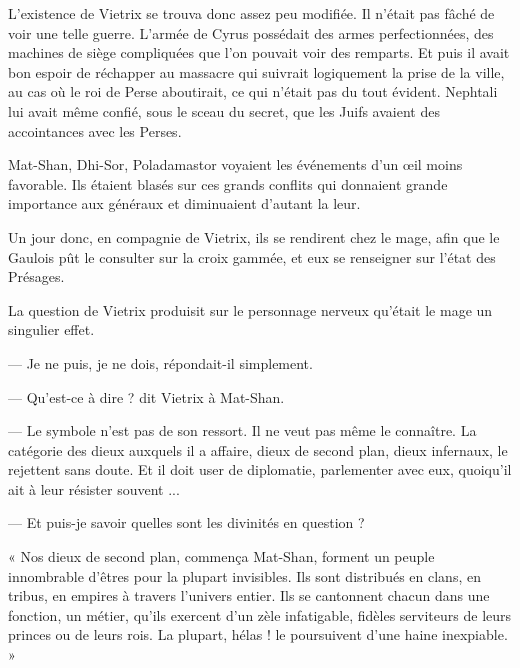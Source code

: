 \documentclass[a4paper, 11pt, oneside, polutonikogreek, french]{article}
\begin{document}
L'existence de Vietrix se trouva donc assez peu modifiée. Il n'était pas fâché de voir une telle guerre. L'armée de Cyrus possédait des armes perfectionnées, des machines de siège compliquées que l'on pouvait voir des remparts. Et puis il avait bon espoir de réchapper au massacre qui suivrait logiquement la prise de la ville, au cas où le roi de Perse aboutirait, ce qui n'était pas du tout évident. Nephtali lui avait même confié, sous le sceau du secret, que les Juifs avaient des accointances avec les Perses.

\bigskip
\centerline{\EightStarTaper}
\centerline{\EightStarTaper\EightStarTaper}
\bigskip

Mat-Shan, Dhi-Sor, Poladamastor voyaient les événements d'un œil moins favorable. Ils étaient blasés sur ces grands conflits qui donnaient grande importance aux généraux et diminuaient d'autant la leur.

Un jour donc, en compagnie de Vietrix, ils se rendirent chez le mage, afin que le Gaulois pût le consulter sur la croix gammée, et eux se renseigner sur l'état des Présages.

La question de Vietrix produisit sur le personnage nerveux qu'était le mage un singulier effet.

--- Je ne puis, je ne dois, répondait-il simplement.

--- Qu'est-ce à dire ? dit Vietrix à Mat-Shan.

--- Le symbole n'est pas de son ressort. Il ne veut pas même le connaître. La catégorie des dieux auxquels il a affaire, dieux de second plan, dieux infernaux, le rejettent sans doute. Et il doit user de diplomatie, parlementer avec eux, quoiqu'il ait à leur résister souvent ...

--- Et puis-je savoir quelles sont les divinités en question ?

\bigskip
\centerline{\EightStarTaper}
\centerline{\EightStarTaper\EightStarTaper}
\bigskip

« Nos dieux de second plan, commença Mat-Shan, forment un peuple innombrable d'êtres pour la plupart invisibles. Ils sont distribués en clans, en tribus, en empires à travers l'univers entier. Ils se cantonnent chacun dans une fonction, un métier, qu'ils exercent d'un zèle infatigable, fidèles serviteurs de leurs princes ou de leurs rois. La plupart, hélas ! le poursuivent d'une haine inexpiable. »
\end{document}
